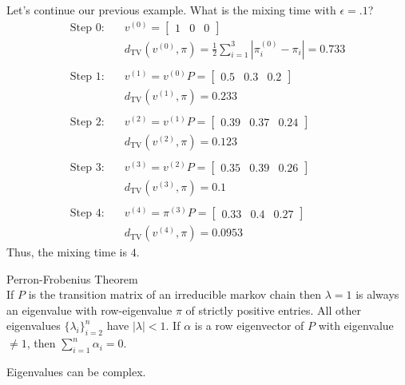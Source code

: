 \documentclass[a4paper]{article}
\begin{document}
Let's continue our previous example. What is the mixing time with $\epsilon = .1$?
\begin{align*}
\text{Step 0:} & \quad v^{(0)} = \begin{bmatrix} 1 & 0 & 0 \end{bmatrix} \\
& \quad d_\text{TV}(v^{(0)}, \pi) = \frac{1}{2} \sum_{i=1}^3 \left| \pi_i^{(0)} - \pi_i \right| = 0.733 \\
\\
\text{Step 1:} & \quad v^{(1)} = v^{(0)} P = \begin{bmatrix} 0.5 & 0.3 & 0.2 \end{bmatrix} \\
& \quad d_\text{TV}(v^{(1)}, \pi) = 0.233 \\
\\
\text{Step 2:} & \quad v^{(2)} = v^{(1)} P = \begin{bmatrix} 0.39 & 0.37 & 0.24 \end{bmatrix} \\
& \quad d_\text{TV}(v^{(2)}, \pi) = 0.123 \\
\\
\text{Step 3:} & \quad v^{(3)} = v^{(2)} P = \begin{bmatrix} 0.35 & 0.39 & 0.26 \end{bmatrix} \\
& \quad d_\text{TV}(v^{(3)}, \pi) = 0.1 \\
\\
\text{Step 4:} & \quad v^{(4)} = \pi^{(3)} P = \begin{bmatrix} 0.33 & 0.4 & 0.27 \end{bmatrix} \\
& \quad d_\text{TV}(v^{(4)}, \pi) = 0.0953
\end{align*}
Thus, the mixing time is $4$.

\begin{theorem}{Perron-Frobenius Theorem}\\
  If $P$ is the transition matrix of an irreducible markov chain then $\lambda=1$ is always an eigenvalue with row-eigenvalue  $\pi$ of strictly positive entries. All other eigenvalues $\{\lambda_{i}\}^{n}_{i=2} $ have $\mid \lambda \mid  < 1$. If $\alpha$ is a row eigenvector of  $P$ with eigenvalue  $\neq 1$, then  $\sum_{i=1}^{n} \alpha_i = 0$.  
\end{theorem}

\begin{note}
  Eigenvalues can be complex. 
\end{note}
\end{document}
